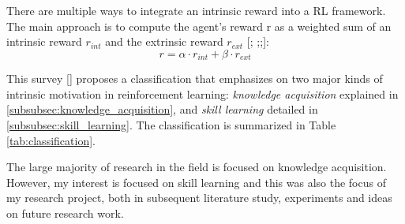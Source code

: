 \documentclass[conference]{IEEEtran}
\begin{document}
There are multiple ways to integrate an intrinsic reward into a RL framework. The main approach is to compute the agent’s reward r as a weighted sum
of an intrinsic reward $r_{int}$ and the extrinsic reward $r_{ext}$ [\cite{burda2018exploration}; \cite{gregor2016variational};\cite{vezhnevets2017feudal};\cite{huang2019learning}]:
\begin{equation*}
r = \alpha \cdot r_{int} + \beta \cdot r_{ext}
\end{equation*}

This survey [\cite{aubret2019survey}] proposes a classification that emphasizes on two major kinds of intrinsic motivation in reinforcement learning: \textit{knowledge acquisition} explained in \ref{subsubsec:knowledge_acquisition}, and \textit{skill learning} detailed in \ref{subsubsec:skill_learning}. The classification is summarized in Table \ref{tab:classification}.

The large majority of research in the field is focused on knowledge acquisition. However, my interest is focused on skill learning and this was also the focus of my research project, both in subsequent literature study, experiments and ideas on future research work.
\end{document}
